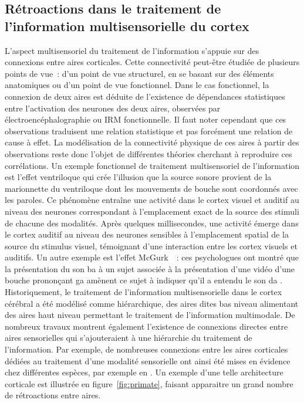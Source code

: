 \documentclass[../main]{subfiles}
\begin{document}
\subsection{Rétroactions dans le traitement de l'information multisensorielle du cortex}

L'aspect multisensoriel du traitement de l'information s'appuie sur des connexions entre aires corticales.
Cette connectivité peut-être étudiée de plusieurs points de vue~: d'un point de vue structurel, en se basant sur des éléments anatomiques ou d'un point de vue fonctionnel.
Dans le cas fonctionnel, la connexion de deux aires est déduite de l'existence de dépendances statistiques entre l'activation des neurones des deux aires, observées par électroencéphalographie ou IRM fonctionnelle. Il faut noter cependant que ces observations traduisent une relation statistique et pas forcément une relation de cause à effet. 
La modélisation de la connectivité physique de ces aires à partir des observations reste donc l'objet de différentes théories cherchant à reproduire ces corrélations. 
Un exemple fonctionnel de traitement multisensoriel de l'information est l'effet ventriloque \parencite{Bonath2007NeuralBO} qui crée l'illusion que la source sonore provient de la marionnette du ventriloque dont les mouvements de bouche sont coordonnés avec les paroles. 
Ce phénomène entraîne une activité dans le cortex visuel et auditif au niveau des neurones correspondant à l'emplacement exact de la source des stimuli de chacune des modalités.
Après quelques millisecondes, une activité émerge dans le cortex auditif au niveau des neurones sensibles à l'emplacement spatial de la source du stimulus visuel, témoignant d'une interaction entre les cortex visuels et auditifs.
Un autre exemple est l'effet McGurk~\parencite{McGurk1976HearingLA}~: ces psychologues ont montré que la présentation du son \og ba \fg{} à un sujet associée à la présentation d'une vidéo d'une bouche prononçant \og ga \fg{} amènent ce sujet à indiquer qu'il a entendu le son \og da \fg{}.
Historiquement, le traitement de l'information multisensorielle dans le cortex cérébral a été modélisé comme hiérarchique, des aires dites bas niveau alimentant des aires haut niveau permettant le traitement de l'information multimodale. 
De nombreux travaux montrent également l'existence de connexions directes entre aires sensorielles qui s'ajouteraient à une hiérarchie du traitement de l'information. Par exemple, de nombreuses connexions entre les aires corticales dédiées au traitement d'une modalité sensorielle ont ainsi été mises en évidence chez différentes espèces, par exemple en \cite{primate_cortex_91,Calvert2004MultisensoryIM, Cappe2009MultisensoryAP,Foxe2005TheCF,Schroeder2005MultisensoryCT}. Un exemple d'une telle architecture corticale est illustrée en figure~\ref{fig:primate}, faisant apparaitre un grand nombre de rétroactions entre aires.
\end{document}
